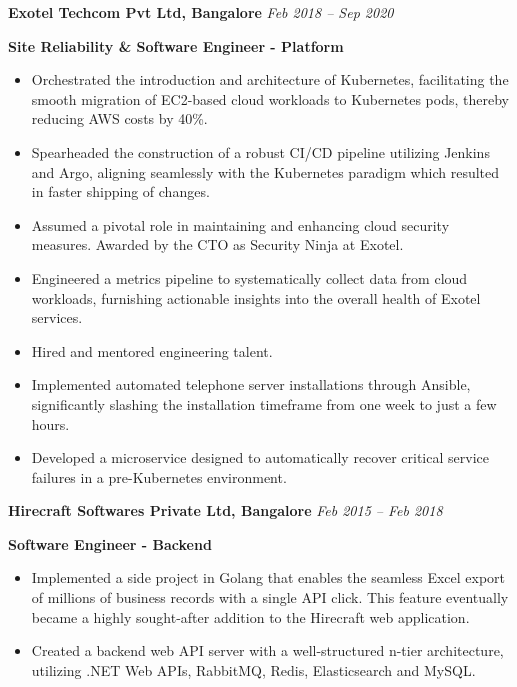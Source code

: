 \documentclass[11pt, oneside]{article}
\begin{document}
\medskip

\textbf{Exotel Techcom Pvt Ltd, Bangalore}
\hfill
\textit{Feb 2018 – Sep 2020}

\textbf{Site Reliability \& Software Engineer - Platform}

\begin{itemize} 
  \item Orchestrated the introduction and architecture of Kubernetes, facilitating the smooth migration of EC2-based cloud workloads to Kubernetes pods, thereby reducing AWS costs by 40\%.
  \item Spearheaded the construction of a robust CI/CD pipeline utilizing Jenkins and Argo, aligning seamlessly with the Kubernetes paradigm which resulted in faster shipping of changes.
  \item Assumed a pivotal role in maintaining and enhancing cloud security measures. Awarded by the CTO as Security Ninja at Exotel.
  \item Engineered a metrics pipeline to systematically collect data from cloud workloads, furnishing actionable insights into the overall health of Exotel services.
  \item Hired and mentored engineering talent.
  \item Implemented automated telephone server installations through Ansible, significantly slashing the installation timeframe from one week to just a few hours.
  \item Developed a microservice designed to automatically recover critical service failures in a pre-Kubernetes environment.

\end{itemize}

\medskip

\textbf{Hirecraft Softwares Private Ltd, Bangalore}
\hfill
\textit{Feb 2015 – Feb 2018}
								 
\textbf{Software Engineer - Backend}

\begin{itemize}
  \item Implemented a side project in Golang that enables the seamless Excel export of millions of business records with a single API click. This feature eventually became a highly sought-after addition to the Hirecraft web application.
  \item Created a backend web API server with a well-structured n-tier architecture, utilizing .NET Web APIs, RabbitMQ, Redis, Elasticsearch and MySQL.

\end{itemize}
\end{document}

